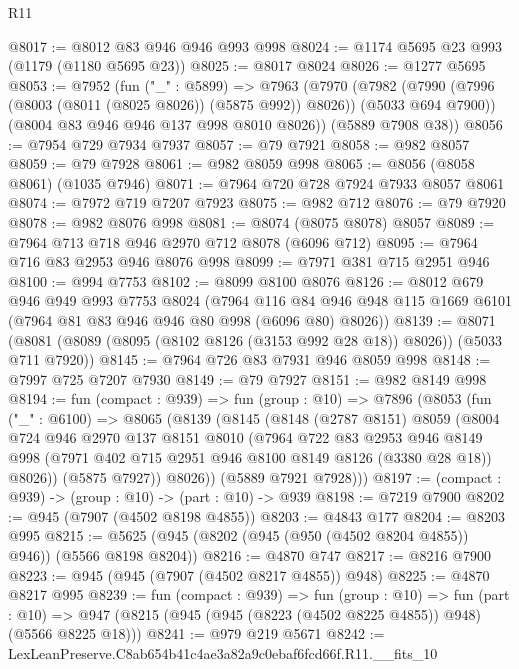 \begin{lexlean}{R11}
\begin{coremodule}
@8017 := @8012 @83 @946 @946 @993 @998
@8024 := @1174 @5695 @23 @993 (@1179 (@1180 @5695 @23))
@8025 := @8017 @8024
@8026 := @1277 @5695
@8053 := @7952
    (fun ("_" : @5899) =>
    @7963
      (@7970
        (@7982 (@7990 (@7996 (@8003 (@8011 (@8025 @8026)) (@5875 @992)) @8026)) (@5033 @694 @7900))
        (@8004 @83 @946 @946 @137 @998 @8010 @8026))
      (@5889 @7908 @38))
@8056 := @7954 @729 @7934 @7937
@8057 := @79 @7921
@8058 := @982 @8057
@8059 := @79 @7928
@8061 := @982 @8059 @998
@8065 := @8056 (@8058 @8061) (@1035 @7946)
@8071 := @7964 @720 @728 @7924 @7933 @8057 @8061
@8074 := @7972 @719 @7207 @7923
@8075 := @982 @712
@8076 := @79 @7920
@8078 := @982 @8076 @998
@8081 := @8074 (@8075 @8078) @8057
@8089 := @7964 @713 @718 @946 @2970 @712 @8078 (@6096 @712)
@8095 := @7964 @716 @83 @2953 @946 @8076 @998
@8099 := @7971 @381 @715 @2951 @946
@8100 := @994 @7753
@8102 := @8099 @8100 @8076
@8126 := @8012
    @679
    @946
    @949
    @993
    @7753
    @8024
    (@7964 @116 @84 @946 @948 @115 @1669 @6101 (@7964 @81 @83 @946 @946 @80 @998 (@6096 @80) @8026))
@8139 := @8071 (@8081 (@8089 (@8095 (@8102 @8126 (@3153 @992 @28 @18)) @8026)) (@5033 @711 @7920))
@8145 := @7964 @726 @83 @7931 @946 @8059 @998
@8148 := @7997 @725 @7207 @7930
@8149 := @79 @7927
@8151 := @982 @8149 @998
@8194 := fun (compact : @939) =>
  fun (group : @10) =>
  @7896
    (@8053
      (fun ("_" : @6100) =>
      @8065
        (@8139
          (@8145
            (@8148
              (@2787 @8151)
              @8059
              (@8004
                @724
                @946
                @2970
                @137
                @8151
                @8010
                (@7964
                  @722
                  @83
                  @2953
                  @946
                  @8149
                  @998
                  (@7971 @402 @715 @2951 @946 @8100 @8149 @8126 (@3380 @28 @18))
                  @8026))
              (@5875 @7927))
            @8026))
        (@5889 @7921 @7928)))
@8197 := (compact : @939) -> (group : @10) -> (part : @10) -> @939
@8198 := @7219 @7900
@8202 := @945 (@7907 (@4502 @8198 @4855))
@8203 := @4843 @177
@8204 := @8203 @995
@8215 := @5625 (@945 (@8202 (@945 (@950 (@4502 @8204 @4855)) @946)) (@5566 @8198 @8204))
@8216 := @4870 @747
@8217 := @8216 @7900
@8223 := @945 (@945 (@7907 (@4502 @8217 @4855)) @948)
@8225 := @4870 @8217 @995
@8239 := fun (compact : @939) =>
  fun (group : @10) =>
  fun (part : @10) => @947 (@8215 (@945 (@945 (@8223 (@4502 @8225 @4855)) @948) (@5566 @8225 @18)))
@8241 := @979 @219 @5671
@8242 := LexLeanPreserve.C8ab654b41c4ae3a82a9c0ebaf6fcd66f.R11.__fits_10

\end{coremodule}
\end{lexlean}
